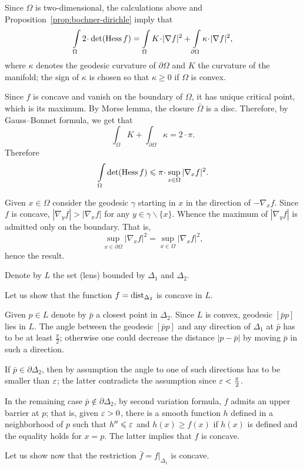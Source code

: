 Since $\Omega$ is two-dimensional, the calculations above and Proposition~\ref{prop:bochner-dirichle} imply that
\[\int\limits_\Omega 
2\cdot\det(\Hess f)
=\int\limits_\Omega 
K\cdot|\nabla f|^2
+
\int\limits_{\partial\Omega}
\kappa\cdot|\nabla f|^2,\]
where $\kappa$ denotes the geodesic curvature of $\partial \Omega$ and $K$ the curvature of the manifold; the sign of $\kappa$ is chosen so that $\kappa\ge 0$ if $\Omega$ is convex.

Since $f$ is concave and vanish on the boundary of $\Omega$,
it has unique critical point, which is its maximum.
By Morse lemma, the closure $\bar\Omega$ is a disc.
Therefore, by Gauss--Bonnet formula, we get that
\[\int_\Omega K+\int_{\partial\Omega}\kappa=2\cdot\pi.\]
Therefore 
\[\int\limits_\Omega 
\det(\Hess f)
\le\pi\cdot\sup_{x\in\Omega}|\nabla_x f|^2.\]

Given $x\in\Omega$ consider the geodesic $\gamma$ starting in $x$ in the direction of $-\nabla_xf$.
Since $f$ is concave, $|\nabla_yf|>|\nabla_xf|$ for any $y\in \gamma\backslash\{x\}$.
Whence the maximum of $|\nabla_yf|$ is admitted only on the boundary.
That is,
\[\sup_{x\in\partial\Omega}|\nabla_x f|^2=\sup_{x\in\Omega}|\nabla_x f|^2,\]
hence the result.
\qeds


Denote by $L$ the set (lens) bounded by $\Delta_1$ and $\Delta_2$.

Let us show that the function $f=\operatorname{dist}_{\Delta_2}$ is concave in $L$.

Given $p\in L$ denote by $\bar p$ a closest point in $\Delta_2$.
Since $L$ is convex, geodesic $[\bar pp]$ lies in $L$.
The angle between the geodesic $[\bar pp]$ and any direction of $\Delta_1$ at $\bar p$ has to be at least $\tfrac\pi2$; otherwise one could decrease the distance $|p-\bar p|$ by moving $\bar p$ in such a direction.

If $\bar p\in\partial \Delta_2$, then by assumption the angle to one of such directions has to be smaller than $\varepsilon$;
the latter contradicts the assumption since $\varepsilon<\tfrac\pi2$.

In the remaining case $\bar p\not\in\partial \Delta_2$, by second variation formula, $f$ admits an upper barrier at $p$;
that is, given $\varepsilon>0$, there is a smooth function $h$ defined in a neighborhood of $p$ such that $h''\leqslant \varepsilon$ and
$h(x)\ge f(x)$ if $h(x)$ is defined and the equality holds for $x=p$.
The latter implies that $f$ is concave.

Let us show now that the restriction $\bar f=f|_{\Delta_1}$ is concave.

